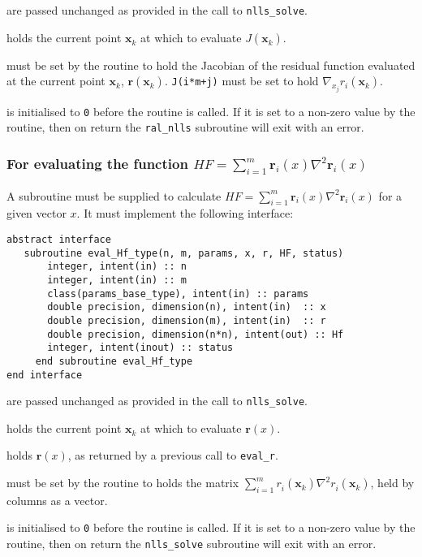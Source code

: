 \documentclass{spec}
\newcommand{\vx}{ {\bm x} } %
\newcommand{\vr}{ {\bm r} } %
\newcommand{\iter}[2][k]{ #2_{#1}^{}} %
\newcommand{\comp}[2][i]{ #2_{#1}^{}} %
\begin{document}
\begin{description}
    are passed unchanged as provided in the call to
      {\tt nlls\_solve}.

    holds the current point $\iter{\vx}$ at which to evaluate
      $J(\iter{\vx})$.

    must be set by the routine to hold the Jacobian of the residual
      function evaluated at the current point $\iter{\vx}$, $\vr(\iter{\vx})$.
      \texttt{J(i*m+j)} must be set to hold $\nabla_{x_j} r_i(\iter{\vx})$.

    is initialised to \texttt{0} before the routine is
      called. If it is set to a non-zero value by the routine, then on return
      the {\tt ral\_nlls} subroutine will exit with an error.
\end{description}

\subsubsection{For evaluating the function $HF = \sum_{i=1}^m \vr_i(x) \nabla^2 \vr_i(x)$}
A subroutine must be supplied to calculate $HF = \sum_{i=1}^m \vr_i(x) \nabla^2 \vr_i(x)$ for a given vector $x$. It must implement the following interface:

\begin{verbatim}
abstract interface
   subroutine eval_Hf_type(n, m, params, x, r, HF, status)
       integer, intent(in) :: n
       integer, intent(in) :: m
       class(params_base_type), intent(in) :: params
       double precision, dimension(n), intent(in)  :: x
       double precision, dimension(m), intent(in)  :: r
       double precision, dimension(n*n), intent(out) :: Hf
       integer, intent(inout) :: status
     end subroutine eval_Hf_type
end interface
\end{verbatim}

\begin{description}
    are passed unchanged as provided in the call to
      {\tt nlls\_solve}.

    holds the current point $\iter{\vx}$ at which to evaluate $\vr(x)$.

    holds $\vr(x)$, as returned by a previous call to \texttt{eval\_r}.

    must be set by the routine to holds the matrix
      $\sum_{i = 1}^m \comp{r}(\iter{\vx})\nabla^2\comp{r}(\iter{\vx})$, held
      by columns as a vector.

    is initialised to \texttt{0} before the routine is called.
      If it is set to a non-zero value by the routine, then on return
      the {\tt nlls\_solve} subroutine will exit with an error.
\end{description}
\end{document}
